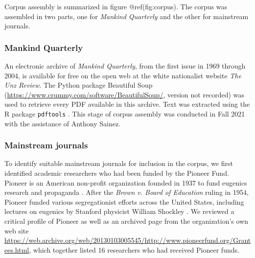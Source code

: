 \documentclass[12pt]{article}
\begin{document}
Corpus assembly is summarized in figure @ref(fig:corpus). The corpus was assembled in two parts, one for \emph{Mankind Quarterly} and the other for mainstream journals.

\hypertarget{mankind-quarterly}{%
\subsubsection*{Mankind Quarterly}\label{mankind-quarterly}}

An electronic archive of \emph{Mankind Quarterly}, from the first issue in 1969 through 2004, is available for free on the open web at the white nationalist website \emph{The Unz Review}. The Python package Beautiful Soup (\url{https://www.crummy.com/software/BeautifulSoup/}, version not recorded) was used to retrieve every PDF available in this archive. Text was extracted using the R package \texttt{pdftools} \cite[3.0.1]{OomsPdftoolsTextExtraction2023}. This stage of corpus assembly was conducted in Fall 2021 with the assistance of Anthony Sainez.

\hypertarget{mainstream-journals}{%
\subsubsection*{Mainstream journals}\label{mainstream-journals}}

To identify suitable mainstream journals for inclusion in the corpus, we first identified academic researchers who had been funded by the Pioneer Fund. Pioneer is an American non-profit organization founded in 1937 to fund eugenics research and propaganda \cite{TuckerFundingScientificRacism2002}. After the \emph{Brown v. Board of Education} ruling in 1954, Pioneer funded various segregationist efforts across the United States, including lectures on eugenics by Stanford physicist William Shockley \cite{JacksonScienceSegregationRace2005}. We reviewed a critical profile of Pioneer \cite{MillerPioneerFundBankrolling1994} as well as an archived page from the organization's own web site \url{https://web.archive.org/web/20130103005545/http://www.pioneerfund.org/Grantees.html}, which together listed 16 researchers who had received Pioneer funds.
\end{document}
